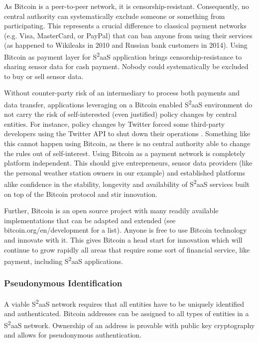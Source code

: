 As Bitcoin is a peer-to-peer network, it is censorship-resistant. Consequently, no central authority can systematically exclude someone or something from participating. This represents a crucial difference to classical payment networks (e.g. Visa, MasterCard, or PayPal) that can ban anyone from using their services (as happened to Wikileaks in 2010 and Russian bank customers in 2014). Using Bitcoin as payment layer for S\textsuperscript{2}aaS application brings censorship-resistance to sharing sensor data for cash payment. Nobody could systematically be excluded to buy or sell sensor data.

Without counter-party risk of an intermediary to process both payments and data transfer, applications leveraging on a Bitcoin enabled S\textsuperscript{2}aaS  environment do not carry the risk of self-interested (even justified) policy changes by central entities. For instance, policy changes by Twitter forced some third-party developers using the Twitter API to shut down their operations \cite{twitterAPI}. Something like this cannot happen using Bitcoin, as there is no central authority able to change the rules out of self-interest. Using Bitcoin as a payment network is completely platform independent. This should give entrepreneurs, sensor data providers (like the personal weather station owners in our example) and established platforms alike confidence in the stability, longevity and availability of S\textsuperscript{2}aaS services built on top of the Bitcoin protocol and stir innovation.

Further, Bitcoin is an open source project with many readily available implementations that can be adapted and extended (see bitcoin.org/en/development for a list). Anyone is free to use Bitcoin technology and innovate with it. This gives Bitcoin a head start for innovation which will continue to grow rapidly all areas that require some sort of financial service, like payment, including S\textsuperscript{2}aaS applications.

\subsubsection{Pseudonymous Identification}

A viable S\textsuperscript{2}aaS network requires that all entities have  to be  uniquely  identified  and  authenticated. Bitcoin addresses can be assigned to all types of entities in a S\textsuperscript{2}aaS network. Ownership of an address is provable with public key cryptography and allows for pseudonymous authentication.

